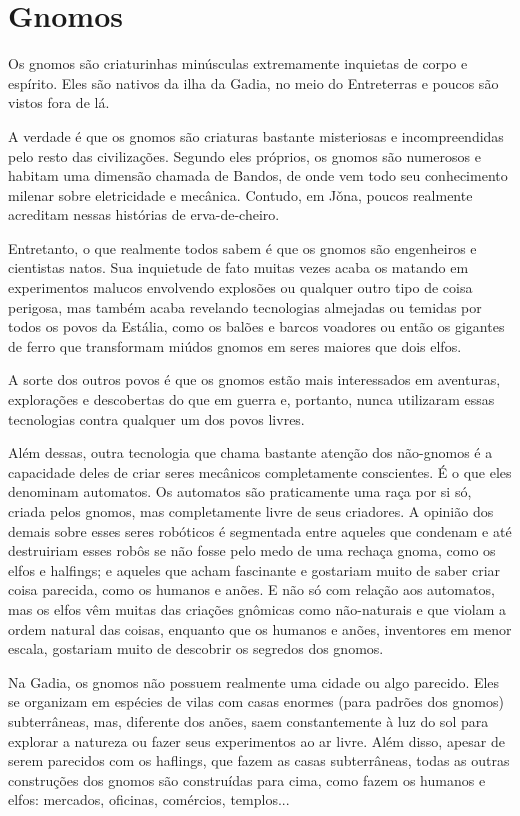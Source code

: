 \documentclass{RPG_Adventure}[2021/10/20]
\begin{document}
\section*{Gnomos}%

Os gnomos são criaturinhas minúsculas extremamente inquietas de corpo e
espírito. Eles são nativos da ilha da Gadia, no meio do Entreterras e poucos são
vistos fora de lá.

A verdade é que os gnomos são criaturas bastante misteriosas e incompreendidas
pelo resto das civilizações. Segundo eles próprios, os gnomos são numerosos e
habitam uma dimensão chamada de Bandos, de onde vem todo seu conhecimento
milenar sobre eletricidade e mecânica. Contudo, em Jǒna, poucos realmente
acreditam nessas histórias de erva-de-cheiro.

Entretanto, o que realmente todos sabem é que os gnomos são engenheiros e
cientistas natos. Sua inquietude de fato muitas vezes acaba os matando em
experimentos malucos envolvendo explosões ou qualquer outro tipo de coisa
perigosa, mas também acaba revelando tecnologias almejadas ou temidas por todos
os povos da Estália, como os balões e barcos voadores ou então os gigantes de
ferro que transformam miúdos gnomos em seres maiores que dois elfos.

A sorte dos outros povos é que os gnomos estão mais interessados em aventuras,
explorações e descobertas do que em guerra e, portanto, nunca utilizaram essas
tecnologias contra qualquer um dos povos livres.

Além dessas, outra tecnologia que chama bastante atenção dos não-gnomos é a
capacidade deles de criar seres mecânicos completamente conscientes. É o que
eles denominam automatos. Os automatos são praticamente uma raça por si só,
criada pelos gnomos, mas completamente livre de seus criadores. A opinião dos
demais sobre esses seres robóticos é segmentada entre aqueles que condenam e até
destruiriam esses robôs se não fosse pelo medo de uma rechaça gnoma, como os
elfos e halfings; e aqueles que acham fascinante e gostariam muito de saber
criar coisa parecida, como os humanos e anões. E não só com relação aos
automatos, mas os elfos vêm muitas das criações gnômicas como não-naturais e que
violam a ordem natural das coisas, enquanto que os humanos e anões, inventores
em menor escala, gostariam muito de descobrir os segredos dos gnomos.

Na Gadia, os gnomos não possuem realmente uma cidade ou algo parecido. Eles se
organizam em espécies de vilas com casas enormes (para padrões dos gnomos)
subterrâneas, mas, diferente dos anões, saem constantemente à luz do sol para
explorar a natureza ou fazer seus experimentos ao ar livre. Além disso, apesar
de serem parecidos com os haflings, que fazem as casas subterrâneas, todas as
outras construções dos gnomos são construídas para cima, como fazem os humanos e
elfos: mercados, oficinas, comércios, templos...
\end{document}
